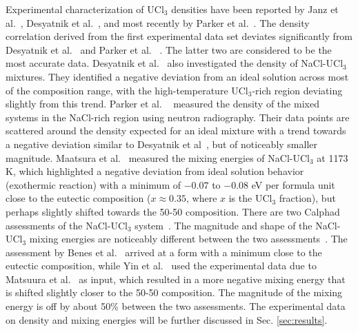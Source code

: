 \documentclass[preprint,3p,10pt,onecolumn,number,sort&compress]{elsarticle}
\begin{document}
Experimental characterization of UCl$_3$ densities have been reported by Janz et al.~\cite{Janz1988}, Desyatnik et al.~\cite{Desyatnik}, and most recently by Parker et al.~\cite{Parker}. The density correlation derived from the first experimental data set deviates significantly from Desyatnik et al.~\cite{Desyatnik} and Parker et al. ~\cite{Parker}. The latter two are considered to be the most accurate data.
Desyatnik et al.~\cite{Desyatnik} also investigated the density of NaCl-UCl$_3$ mixtures. They identified a negative deviation from an ideal solution across most of the composition range, with the high-temperature UCl$_3$-rich region deviating slightly from this trend. Parker et al. ~\cite{Parker} measured the density of the mixed systems in the NaCl-rich region using neutron radiography. Their data points are scattered around the density expected for an ideal mixture with a trend towards a negative deviation similar to Desyatnik et al~\cite{Desyatnik}, but of noticeably smaller magnitude.
Maatsura et al.~\cite{Matsuura} measured the mixing energies of NaCl-UCl$_3$ at 1173 K, which highlighted a negative deviation from ideal solution behavior (exothermic reaction) with a minimum of $-0.07$ to $-0.08$ eV per formula unit close to the eutectic composition ($x\approx 0.35$, where $x$ is the UCl$_3$ fraction), but perhaps slightly shifted towards the 50-50 composition. There are two Calphad assessments of the NaCl-UCl$_3$ system~\cite{BENES2008, YIN2020}. The magnitude and shape of the NaCl-UCl$_3$ mixing energies are noticeably different between the two assessments~\cite{YIN2020}. The assessment by Benes et al.~\cite{BENES2008} arrived at a form with a minimum close to the eutectic composition, while Yin et al.~\cite{YIN2020} used the experimental data due to Matsuura et al.~\cite{Matsuura} as input, which resulted in a more negative mixing energy that is shifted slightly closer to the 50-50 composition. The magnitude of the mixing energy is off by about 50\% between the two assessments. The experimental data on density and mixing energies will be further discussed in Sec. \ref{sec:results}.
\end{document}
